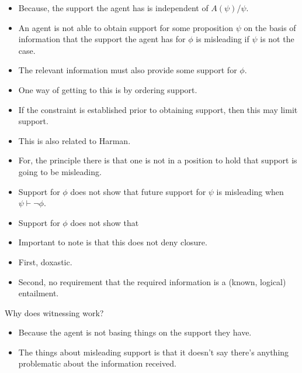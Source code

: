 \documentclass[10pt]{article}
\begin{document}
\begin{itemize}
\item Because, the support the agent has is independent of \(A(\psi)\)/\(\psi\).
\end{itemize}

\begin{itemize}
\item An agent is not able to obtain support for some proposition \(\psi\) on the basis of information that the support the agent has for \(\phi\) is misleading if \(\psi\) is not the case.
\end{itemize}

\begin{itemize}
\item The relevant information must also provide some support for \(\phi\).
\item One way of getting to this is by ordering support.
\item If the constraint is established prior to obtaining support, then this may limit support.
\end{itemize}

\begin{itemize}
\item This is also related to Harman.
\item For, the principle there is that one is not in a position to hold that support is going to be misleading.
\item Support for \(\phi\) does not show that future support for \(\psi\) is misleading when \(\psi \vdash \lnot\phi\).
\item Support for \(\phi\) does not show that 
\end{itemize}

\begin{itemize}
\item Important to note is that this does not deny closure.
\item First, doxastic.
\item Second, no requirement that the required information is a (known, logical) entailment.
\end{itemize}

Why does witnessing work?

\begin{itemize}
\item Because the agent is not basing things on the support they have.
\item The things about misleading support is that it doesn't say there's anything problematic about the information received.
\end{itemize}
\end{document}
